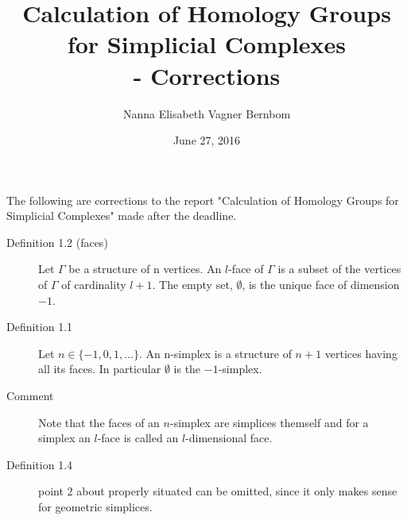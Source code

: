 \documentclass[11pt,a4paper]{article}
\begin{document}
\title{\textbf{Calculation of Homology Groups\\for Simplicial Complexes\\ - Corrections}}   
\author{Nanna Elisabeth Vagner Bernbom} 
\date{June 27, 2016}
\maketitle

The following are corrections to the report "Calculation of Homology Groups for Simplicial Complexes" made after the deadline.
\begin{description}
\item[Definition 1.2 (faces)] Let $\Gamma$ be a structure of n vertices. An $l$-face of $\Gamma$ is a subset of the vertices of $\Gamma$ of cardinality $l+1$. The empty set, $\emptyset$, is the unique face of dimension $-1$.
\item[Definition 1.1] Let $n\in\{-1,0,1,\dots\}$. An n-simplex is a structure of $n+1$ vertices having all its faces. In particular $\emptyset$ is the $-1$-simplex.
\item[Comment] Note that the faces of an $n$-simplex are simplices themself and for a simplex an $l$-face is called an $l$-dimensional face.
\item[Definition 1.4] point 2 about properly situated can be omitted, since it only makes sense for geometric simplices.
\end{description}
\end{document}
